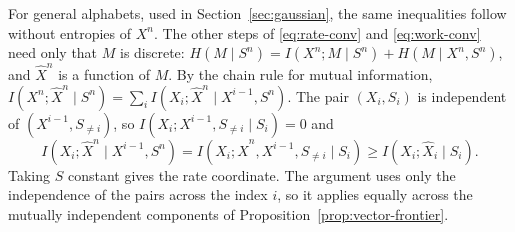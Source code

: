 \documentclass[letterpaper,onecolumn]{IEEEtran}
\theoremstyle{definition}
\theoremstyle{remark}
\newcommand{\hX}{\widehat{X}}
\newcommand{\hXn}{\widehat{X}^{n}}
\newcommand{\1}{\mathbf{1}}
\begin{document}
For general alphabets, used in Section~\ref{sec:gaussian}, the same
inequalities follow without entropies of $X^n$. The other steps of
\eqref{eq:rate-conv} and \eqref{eq:work-conv} need only that $M$ is discrete:
$H(M\mid S^n)=I(X^n;M\mid S^n)+H(M\mid X^n,S^n)$, and $\hXn$ is a function of
$M$. By the chain rule for mutual information,
$I(X^n;\hXn\mid S^n)=\sum_{i}I(X_i;\hXn\mid X^{i-1},S^n)$. The pair
$(X_i,S_i)$ is independent of $(X^{i-1},S_{\ne i})$, so
$I(X_i;X^{i-1},S_{\ne i}\mid S_i)=0$ and
\begin{equation*}
 I(X_i;\hXn\mid X^{i-1},S^n)
 =I(X_i;\hXn,X^{i-1},S_{\ne i}\mid S_i)
 \ge I(X_i;\hX_i\mid S_i).
\end{equation*}
Taking $S$ constant gives the rate coordinate. The argument uses only the
independence of the pairs across the index $i$, so it applies equally across
the mutually independent components of
Proposition~\ref{prop:vector-frontier}.



\end{document}
